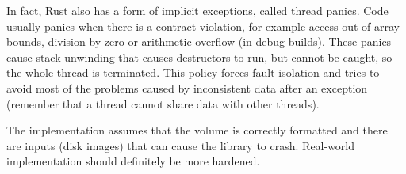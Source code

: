 In fact, Rust also has a form of implicit exceptions, called thread panics. Code
usually panics when there is a contract violation, for example access out of
array bounds, division by zero or arithmetic overflow (in debug builds). These
panics cause stack unwinding that causes destructors to run, but cannot be
caught, so the whole thread is terminated. This policy forces fault isolation
and tries to avoid most of the problems caused by inconsistent data after an
exception (remember that a thread cannot share data with other threads).

The implementation assumes that the volume is correctly formatted and there are
inputs (disk images) that can cause the library to crash. Real-world
implementation should definitely be more hardened.
